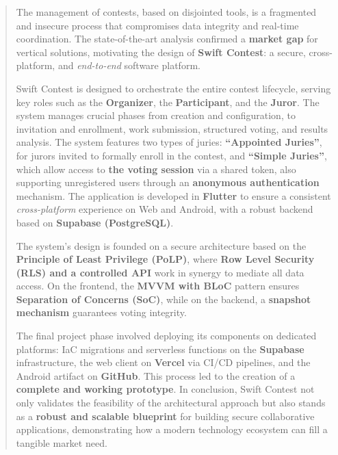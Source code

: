 \begin{titlepage}
    \begin{abstract}
        The management of contests, based on disjointed tools, is a fragmented and insecure process that compromises data integrity and real-time coordination.
        The state-of-the-art analysis confirmed a \textbf{market gap} for vertical solutions, motivating the design of \textbf{Swift Contest}: a secure, cross-platform, and \emph{end-to-end} software platform.

        Swift Contest is designed to orchestrate the entire contest lifecycle, serving key roles such as the \textbf{Organizer}, the \textbf{Participant}, and the \textbf{Juror}.
        The system manages crucial phases from creation and configuration, to invitation and enrollment, work submission, structured voting, and results analysis.
        The system features two types of juries: \textbf{``Appointed Juries''}, for jurors invited to formally enroll in the contest, and \textbf{``Simple Juries''}, which allow access to \textbf{the voting session} via a shared token, also supporting unregistered users through an \textbf{anonymous authentication} mechanism.
        The application is developed in \textbf{Flutter} to ensure a consistent \emph{cross-platform} experience on Web and Android, with a robust backend based on \textbf{Supabase (PostgreSQL)}.

        The system's design is founded on a secure architecture based on the \textbf{Principle of Least Privilege (PoLP)}, where \textbf{Row Level Security (RLS) and a controlled API} work in synergy to mediate all data access.
        On the frontend, the \textbf{MVVM with BLoC} pattern ensures \textbf{Separation of Concerns (SoC)}, while on the backend, a \textbf{snapshot mechanism} guarantees voting integrity.

        The final project phase involved deploying its components on dedicated platforms: IaC migrations and serverless functions on the \textbf{Supabase} infrastructure, the web client on \textbf{Vercel} via CI/CD pipelines, and the Android artifact on \textbf{GitHub}.
        This process led to the creation of a \textbf{complete and working prototype}.
        In conclusion, Swift Contest not only validates the feasibility of the architectural approach but also stands as a \textbf{robust and scalable blueprint} for building secure collaborative applications, demonstrating how a modern technology ecosystem can fill a tangible market need.
    \end{abstract}
\end{titlepage}